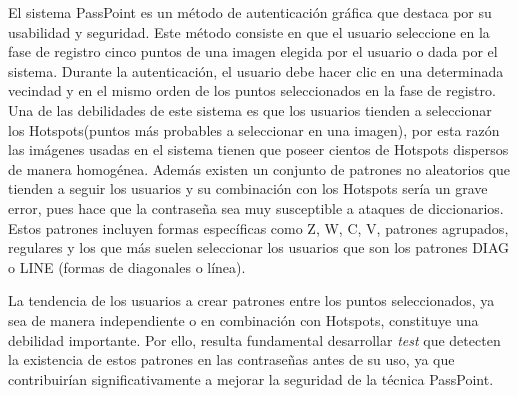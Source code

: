 \documentclass[12pt]{report}
\begin{document}
	El sistema PassPoint\cite{1} es un método de autenticación gráfica que destaca por su usabilidad y seguridad. Este método consiste  en que el usuario seleccione en la fase de registro  cinco puntos de una imagen elegida por el usuario o dada por el sistema. Durante la autenticación, el usuario debe hacer clic en una determinada vecindad y en el mismo orden de los puntos seleccionados en la fase de  registro. Una de las debilidades de este sistema es que los usuarios tienden a seleccionar los Hotspots\cite{4}(puntos más probables a seleccionar en una imagen), por esta razón las imágenes usadas en el sistema tienen que poseer cientos de Hotspots dispersos de manera homogénea. Además existen un conjunto de patrones no aleatorios que tienden a seguir los usuarios y su combinación con los Hotspots sería un grave error, pues hace que la contraseña sea muy susceptible a ataques de diccionarios. Estos patrones incluyen formas específicas como Z, W, C, V, patrones agrupados, regulares y los que más suelen seleccionar los usuarios  que son los  patrones DIAG o LINE (formas de diagonales o línea)\cite{5}.
	
	
	La tendencia de los usuarios a crear patrones entre los puntos seleccionados, ya sea de manera independiente o en combinación con Hotspots, constituye una debilidad importante. Por ello, resulta fundamental desarrollar \textit{test} que detecten la existencia de estos patrones en las contraseñas antes de su uso, ya que contribuirían significativamente a mejorar la seguridad de la técnica PassPoint.
	
	
\end{document}
